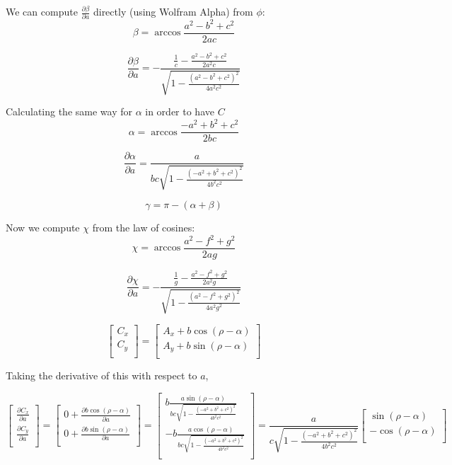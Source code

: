 \documentclass[11pt]{article}
\begin{document}
We can compute $\frac{\partial \beta}{\partial a}$ directly (using Wolfram Alpha) from $\phi$:
\[
\beta = \arccos{\frac{a^2 - b^2 + c^2}{2 a c}}
\]

\[
\frac{\partial \beta}{\partial a} =
-\frac{\frac{1}{c} - \frac{a^2 - b^2 + c^2}{2 a^2 c}}
{\sqrt{1 - \frac{(a^2 - b^2 + c^2)^2}{4 a^2 c^2}}}
\]

Calculating the same way for $\alpha$ in order to have $C$
\[
\alpha = \arccos{\frac{-a^2 +  b^2 + c^2}{2 b c}}
\]

\[
\frac{\partial \alpha}{\partial a} =
\frac{a}
{bc \sqrt{1 - \frac{(-a^2 + b^2 + c^2)^2}{4 b^2 c^2}}}
\]

\[ \gamma = \pi - (\alpha + \beta) \]

Now we compute $\chi$ from the law of cosines:
\[
\chi = \arccos{\frac{a^2 - f^2 + g^2}{2 a g}}
\]

\[
\frac{\partial \chi}{\partial a} =
-\frac{\frac{1}{g} - \frac{a^2 - f^2 + g^2}{2 a^2 g}}
{\sqrt{1 - \frac{(a^2 - f^2 + g^2)^2}{4 a^2 g^2}}}
\]


\[
\begin{bmatrix}
  C_x \\
  C_y \\
\end{bmatrix} =
\begin{bmatrix}
 A_x + b \cos{(\rho - \alpha)} \\
 A_y + b \sin{(\rho - \alpha)} \\
\end{bmatrix}
\]

Taking the derivative of this with respect to $a$,

\[
\begin{bmatrix}
  \frac{\partial C_x}{\partial a} \\
  \frac{\partial C_y}{\partial a} \\
\end{bmatrix} =
\begin{bmatrix}
 0 + \frac{\partial b \cos{(\rho - \alpha)}}{\partial a} \\
 0 + \frac{\partial b \sin{(\rho - \alpha)}}{\partial a} \\
\end{bmatrix} =
\begin{bmatrix}
b \frac{a\sin{(\rho - \alpha)}}
{bc \sqrt{1 - \frac{(-a^2 + b^2 + c^2)^2}{4 b^2 c^2}}}
  \\
- b \frac{a\cos{(\rho - \alpha)}}
{bc \sqrt{1 - \frac{(-a^2 + b^2 + c^2)^2}{4 b^2 c^2}}}
  \\
\end{bmatrix} =
\frac{a}{c \sqrt{1 - \frac{(-a^2 + b^2 + c^2)^2}{4 b^2 c^2}}}
\begin{bmatrix}
 \sin{(\rho - \alpha)}  \\
- \cos{(\rho - \alpha)}  \\
\end{bmatrix}
\]
\end{document}
